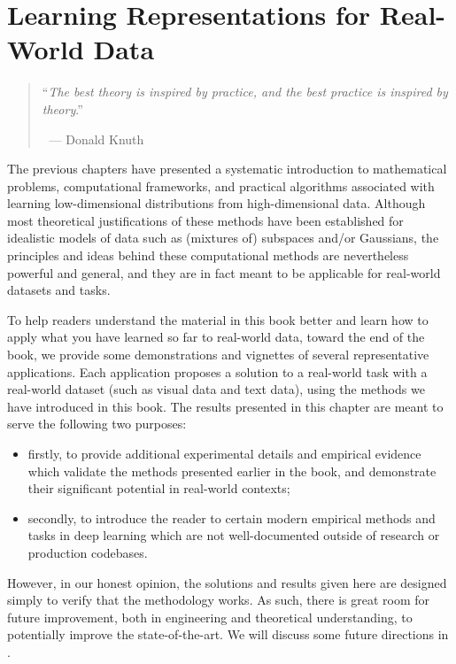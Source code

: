 \documentclass[../../book-main.tex]{subfiles}
\begin{document}
\chapter{Learning Representations for Real-World Data}
\label{ch:applications}

\begin{quote}
\hfill    ``{\em The best theory is inspired by practice, and the best practice is inspired by theory}.''

$~$ \hfill --- Donald Knuth   
\end{quote}
\vspace{5mm}

The previous chapters have presented a systematic introduction to mathematical problems, computational frameworks, and practical algorithms associated with learning low-dimensional distributions from high-dimensional data. Although most theoretical justifications of these methods have been established for idealistic models of data such as (mixtures of) subspaces and/or Gaussians, the principles and ideas behind these computational methods are nevertheless powerful and general, and they are in fact meant to be applicable for real-world datasets and tasks. 

To help readers understand the material in this book better and learn how to apply what you have learned so far to real-world data, toward the end of the book, we provide some demonstrations and vignettes of several representative applications. Each application proposes a solution to a real-world task with a real-world dataset (such as visual data and text data), using the methods we have introduced in this book. The results presented in this chapter are meant to serve the following two purposes: 
\begin{itemize}
    \item firstly, to provide additional experimental details and empirical evidence which validate the methods presented earlier in the book, and demonstrate their significant potential in real-world contexts;
    \item secondly, to introduce the reader to certain modern empirical methods and tasks in deep learning which are not well-documented outside of research or production codebases.
\end{itemize}
However, in our honest opinion, the solutions and results given here are designed simply to verify that the methodology works. As such, there is great room for future improvement, both in engineering and theoretical understanding, to potentially improve the state-of-the-art. We will discuss some future directions in .  
\end{document}

